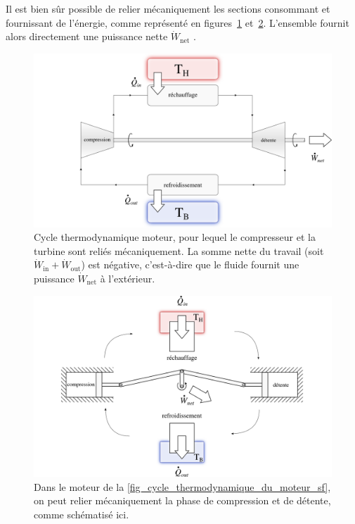 		Il est bien sûr possible de relier mécaniquement les sections consommant et fournissant de l’énergie, comme représenté en figures~\ref{fig_cycle_thermodynamique_du_moteur_axe_so} et~\ref{fig_cycle_thermodynamique_du_moteur_axe_sf}. L’ensemble fournit alors directement une puissance nette $\dot{W}_\text{net}$ .

		\begin{figure}
			\begin{center}
				\includegraphics[width=\textwidth]{images/mot_so_2.png}
			\end{center}
			\caption{Cycle thermodynamique moteur, pour lequel le compresseur et la turbine sont reliés mécaniquement.
		La somme nette du travail (soit	$\dot{W}_\text{in} + \dot{W}_\text{out}$) est négative, c’est-à-dire que le fluide fournit une puissance $\dot{W}_\text{net}$ à l’extérieur.}
			\label{fig_cycle_thermodynamique_du_moteur_axe_so}
		\end{figure}

		\begin{figure}
			\begin{center}
				\includegraphics[width=\textwidth]{images/mot_sf_2.png}
			\end{center}
			\caption{Dans le moteur de la \cref{fig_cycle_thermodynamique_du_moteur_sf}, on peut relier mécaniquement la phase de compression et de détente, comme schématisé ici.}
			\label{fig_cycle_thermodynamique_du_moteur_axe_sf}
		\end{figure}


